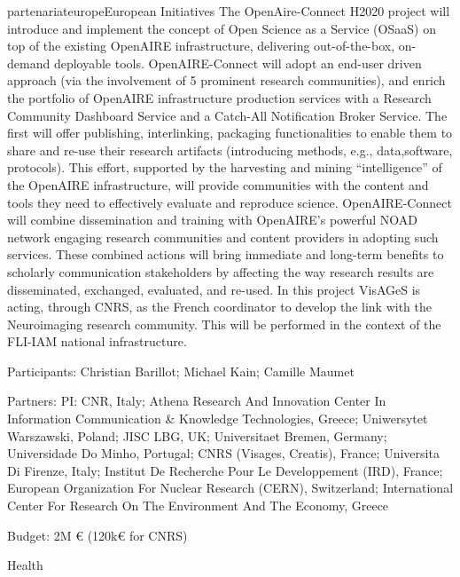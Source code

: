 \documentclass{ra2018}
\begin{document}
\begin{module}{partenariat}{europe}{European Initiatives}
The OpenAire-Connect H2020 project will introduce and implement the concept of Open Science as a Service (OSaaS) on top of the existing OpenAIRE infrastructure, delivering out-of-the-box, on-demand deployable tools. OpenAIRE-Connect will adopt an end-user driven approach (via the involvement of 5 prominent research communities), and enrich the portfolio of OpenAIRE infrastructure production services with a Research Community Dashboard Service and a Catch-All Notification Broker Service. The first will offer publishing, interlinking, packaging functionalities to enable them to share and re-use their research artifacts (introducing methods, e.g., data,software, protocols). This effort, supported by the harvesting and mining “intelligence” of the OpenAIRE infrastructure, will provide communities with the content and tools they need to effectively evaluate and reproduce science. OpenAIRE-Connect will combine dissemination and training with OpenAIRE's powerful NOAD network engaging research communities and content providers in adopting such services. These combined actions will bring immediate and long-term benefits to scholarly communication stakeholders by affecting the way research results are disseminated, exchanged, evaluated, and re-used. In this project VisAGeS is acting, through CNRS, as the French coordinator to develop the link with the Neuroimaging research community. This will be performed in the context of the FLI-IAM national infrastructure.

    Participants: Christian Barillot; Michael Kain; Camille Maumet

    Partners: PI: CNR, Italy; Athena Research And Innovation Center In Information Communication \& Knowledge Technologies, Greece; Uniwersytet Warszawski, Poland; JISC LBG, UK; Universitaet Bremen, Germany; Universidade Do Minho, Portugal; CNRS (Visages, Creatis), France; Universita Di Firenze, Italy; Institut De Recherche Pour Le Developpement (IRD), France; European Organization For Nuclear Research (CERN), Switzerland; International Center For Research On The Environment And The Economy, Greece

    Budget: 2M € (120k€ for CNRS)

Health


\end{module}
\end{document}
